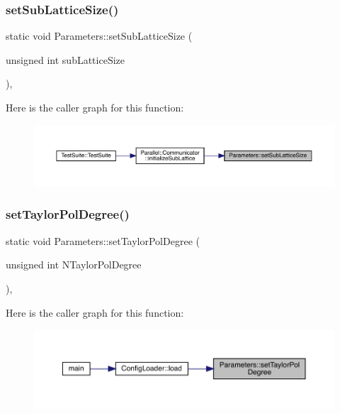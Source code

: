 \subsubsection{\texorpdfstring{setSubLatticeSize()}{setSubLatticeSize()}}
{\footnotesize\ttfamily static void Parameters\+::set\+Sub\+Lattice\+Size (\begin{DoxyParamCaption}\item[{unsigned int}]{sub\+Lattice\+Size }\end{DoxyParamCaption})\hspace{0.3cm}{\ttfamily [inline]}, {\ttfamily [static]}}

Here is the caller graph for this function\+:\nopagebreak
\begin{figure}[H]
\begin{center}
\leavevmode
\includegraphics[width=350pt]{class_parameters_a978f5547036311816f21e3ebe8af77fc_icgraph}
\end{center}
\end{figure}
\mbox{\label{class_parameters_a68fb3eccef5dae481915be728ef61fb6}} 
\subsubsection{\texorpdfstring{setTaylorPolDegree()}{setTaylorPolDegree()}}
{\footnotesize\ttfamily static void Parameters\+::set\+Taylor\+Pol\+Degree (\begin{DoxyParamCaption}\item[{unsigned int}]{N\+Taylor\+Pol\+Degree }\end{DoxyParamCaption})\hspace{0.3cm}{\ttfamily [inline]}, {\ttfamily [static]}}

Here is the caller graph for this function\+:\nopagebreak
\begin{figure}[H]
\begin{center}
\leavevmode
\includegraphics[width=350pt]{class_parameters_a68fb3eccef5dae481915be728ef61fb6_icgraph}
\end{center}
\end{figure}
\mbox{\label{class_parameters_a2d7077c967fffbdc6652559ec261b67c}} 
